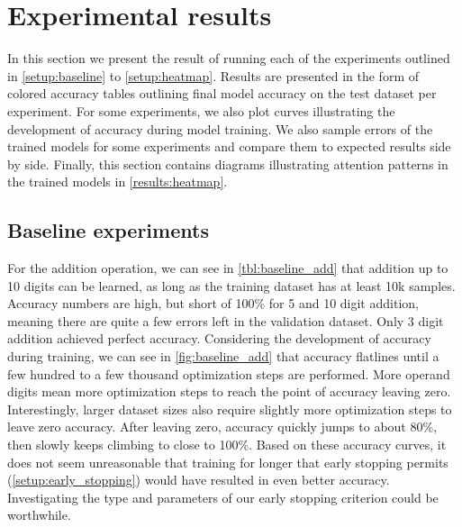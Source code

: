 \section{Experimental results}

In this section we present the result of running each of the experiments outlined in \cref{setup:baseline} to \cref{setup:heatmap}. Results are presented in the form of colored accuracy tables outlining final model accuracy on the test dataset per experiment.
For some experiments, we also plot curves illustrating the development of accuracy during model training.
We also sample errors of the trained models for some experiments and compare them to expected results side by side.
Finally, this section contains diagrams illustrating attention patterns in the trained models in \cref{results:heatmap}.

\subsection{Baseline experiments}
\label{results:baseline}

For the addition operation, we can see in \cref{tbl:baseline_add} that addition up to 10 digits can be learned, as long as the training dataset has at least 10k samples. Accuracy numbers are high, but short of 100\% for 5 and 10 digit addition, meaning there are quite a few errors left in the validation dataset. Only 3 digit addition achieved perfect accuracy.
Considering the development of accuracy during training, we can see in \cref{fig:baseline_add} that accuracy flatlines until a few hundred to a few thousand optimization steps are performed. More operand digits mean more optimization steps to reach the point of accuracy leaving zero. Interestingly, larger dataset sizes also require slightly more optimization steps to leave zero accuracy.
After leaving zero, accuracy quickly jumps to about 80\%, then slowly keeps climbing to close to 100\%.
Based on these accuracy curves, it does not seem unreasonable that training for longer that early stopping permits (\cref{setup:early_stopping}) would have resulted in even better accuracy. Investigating the type and parameters of our early stopping criterion could be worthwhile.


